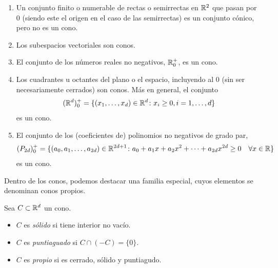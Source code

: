\documentclass{book}
\begin{document}
\begin{example} \label{ex:conos}
	\begin{enumerate}
		\item Un conjunto finito o numerable de rectas o semirrectas en $\mathbb{R}^2$ que pasan por 0 (siendo este el origen en el caso de las semirrectas) es un conjunto cónico, pero no es un cono.
		\item Los subespacios vectoriales son conos.
		\item El conjunto de los números reales no negativos, $\mathbb{R}^+_0$, es un cono.
		\item Los cuadrantes u octantes del plano o el espacio, incluyendo al 0 (sin ser necesariamente cerrados) son conos. Más en general, el conjunto
				\[ (\mathbb{R}^d)^+_0 = \{(x_1,\dots,x_d) \in \mathbb{R}^d \colon x_i \ge 0, i = 1,\dots,d \} \]
			  es un cono.
		\item El conjunto de los (coeficientes de) polinomios no negativos de grado par,
				\[ (P_{2d})^+_0 = \{(a_0,a_1,\dots,a_{2d}) \in \mathbb{R}^{2d+1} \colon a_0 + a_1x+a_2x^2+\dots+a_{2d}x^{2d} \ge 0\quad \forall x \in \mathbb{R} \} \]
			  es un cono.
	\end{enumerate}
\end{example}

Dentro de los conos, podemos destacar una familia especial, cuyos elementos se denominan conos propios.

\begin{definition}
	Sea $C \subset \mathbb{R}^d$ un cono.
	\begin{itemize}
		\item $C$ es \emph{sólido} si tiene interior no vacío.
		\item $C$ es \emph{puntiaguado} si $C \cap (-C) = \{0\}$.
		\item $C$ es \emph{propio} si es cerrado, sólido y puntiagudo.
	\end{itemize}
\end{definition}
\end{document}
